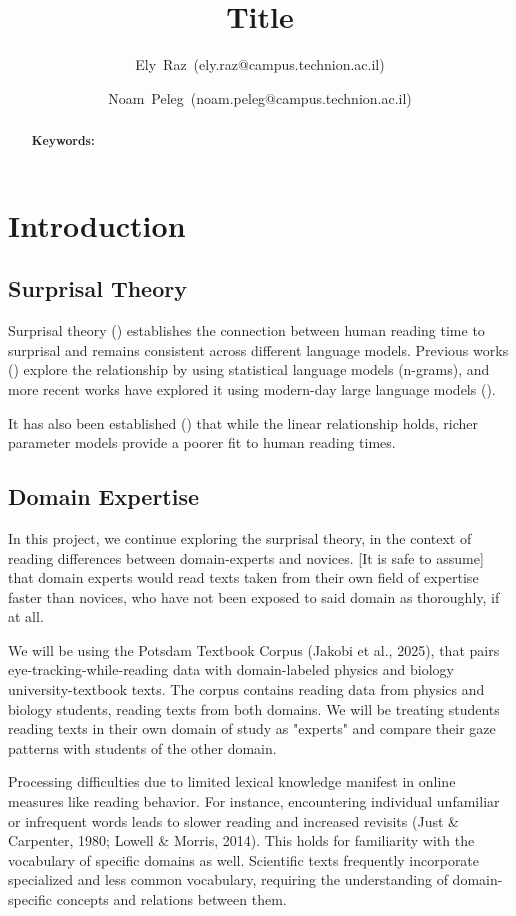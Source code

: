 \documentclass[10pt,letterpaper]{article}
\title{Title}
\author[1]{\mbox{Ely Raz (ely.raz@campus.technion.ac.il)}}
\author[2]{\mbox{Noam Peleg (noam.peleg@campus.technion.ac.il)}}
\begin{document}
\maketitle

\begin{abstract}

\textbf{Keywords:}
\end{abstract}

\section{Introduction}

\subsection{Surprisal Theory}

Surprisal theory () establishes the connection between human reading time to surprisal and remains consistent across different language models.
Previous works () explore the relationship by using statistical language models (n-grams), and more recent works have explored it using modern-day large language models ().

It has also been established () that while the linear relationship holds, richer parameter models provide a poorer fit to human reading times.

\subsection{Domain Expertise}

In this project, we continue exploring the surprisal theory, in the context of reading differences between domain-experts and novices.
[It is safe to assume] that domain experts would read texts taken from their own field of expertise faster than novices, who have not been exposed to said domain as thoroughly, if at all.

We will be using the Potsdam Textbook Corpus (Jakobi et al., 2025), that pairs eye-tracking-while-reading data with domain-labeled physics and biology university-textbook texts. The corpus contains reading data from physics and biology students, reading texts from both domains. We will be treating students reading texts in their own domain of study as "experts" and compare their gaze patterns with students of the other domain.

Processing difficulties due to limited lexical knowledge manifest in online measures like reading behavior. For instance, encountering individual unfamiliar or infrequent words leads to slower reading and increased revisits (Just \& Carpenter, 1980; Lowell \& Morris, 2014). This holds for familiarity with the vocabulary of specific domains as well. Scientific texts frequently incorporate specialized and less common vocabulary, requiring the understanding of domain-specific concepts and relations between them.
\end{document}
